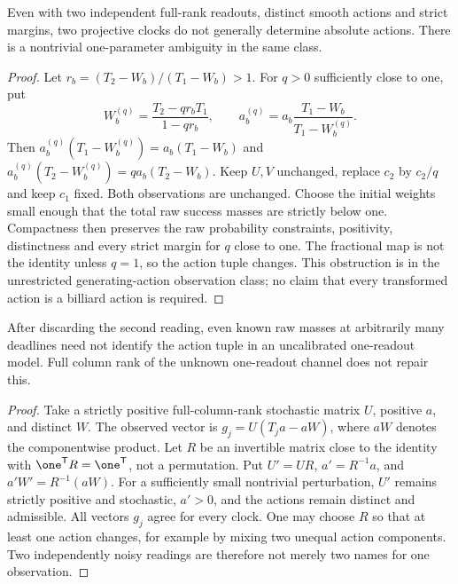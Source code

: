 \begin{proposition}
\label{prop:v81-two-projective}
Even with two independent full-rank readouts, distinct smooth actions
and strict margins, two projective clocks do not generally determine
absolute actions.  There is a nontrivial one-parameter ambiguity in the
same class.
\end{proposition}
\begin{proof}
Let $r_b=(T_2-W_b)/(T_1-W_b)>1$.  For $q>0$ sufficiently close to one,
put
\[
 W_b^{(q)}=\frac{T_2-qr_bT_1}{1-qr_b},\qquad
 a_b^{(q)}=a_b\frac{T_1-W_b}{T_1-W_b^{(q)}}.
\]
Then $a_b^{(q)}(T_1-W_b^{(q)})=a_b(T_1-W_b)$ and
$a_b^{(q)}(T_2-W_b^{(q)})=q a_b(T_2-W_b)$.  Keep $U,V$ unchanged,
replace $c_2$ by $c_2/q$ and keep $c_1$ fixed.  Both observations are
unchanged.  Choose the initial weights small enough that the total raw success
masses are strictly below one.  Compactness then preserves the raw
probability constraints, positivity, distinctness and every strict
margin for $q$ close to one.  The fractional map is not the
identity unless $q=1$, so the action tuple changes.  This obstruction
is in the unrestricted generating-action observation class; no claim
that every transformed action is a billiard action is required.
\end{proof}

\begin{proposition}
\label{prop:v81-one-view}
After discarding the second reading, even known raw masses at arbitrarily
many deadlines need not identify the action tuple in an uncalibrated
one-readout model.  Full column rank of the unknown one-readout channel
does not repair this.
\end{proposition}
\begin{proof}
Take a strictly positive full-column-rank stochastic matrix $U$, positive
$a$, and distinct $W$.  The observed vector is $g_j=U(T_ja-aW)$, where
$aW$ denotes the componentwise product.  Let $R$ be an invertible matrix
close to the identity with $\one^{\mathsf T}R=\one^{\mathsf T}$, not a
permutation.  Put $U'=UR$, $a'=R^{-1}a$, and
$a'W'=R^{-1}(aW)$.  For a sufficiently small nontrivial perturbation,
$U'$ remains strictly positive and stochastic, $a'>0$, and the actions
remain distinct and admissible.  All vectors $g_j$ agree for every
clock.  One may choose $R$ so that at least one action changes, for
example by mixing two unequal action components.  Two independently
noisy readings are therefore not merely two names for one observation.
\end{proof}
